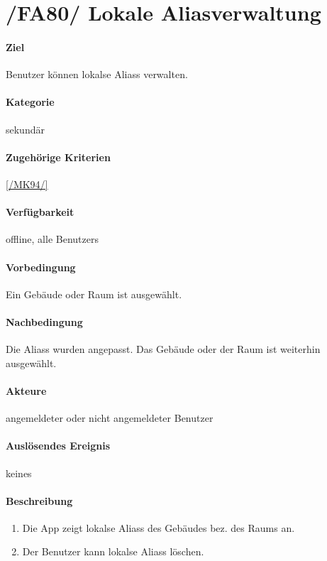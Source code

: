 \section[Lokale Aliasverwaltung]{/FA80/ Lokale Aliasverwaltung}
\label{/FA80/}
\paragraph{Ziel}
\Gls{Benutzer} können \glspl{lokal}e \Glspl{Alias} verwalten.
\paragraph{Kategorie}
sekundär
\paragraph{Zugehörige Kriterien}
\ref{/MK94/}
\paragraph{Verfügbarkeit}
\gls{offline}, alle \Glspl{Benutzer}
\paragraph{Vorbedingung}
Ein Gebäude oder Raum ist ausgewählt.
\paragraph{Nachbedingung}
Die \Glspl{Alias} wurden angepasst. Das Gebäude oder der Raum ist weiterhin ausgewählt.
\paragraph{Akteure}
angemeldeter oder nicht angemeldeter \Gls{Benutzer}
\paragraph{Auslösendes Ereignis} keines
\paragraph{Beschreibung}
\begin{enumerate}
      \item Die App zeigt \glspl{lokal}e \Glspl{Alias} des Gebäudes bez. des Raums an.
      \item Der \Gls{Benutzer} kann \glspl{lokal}e \Glspl{Alias} löschen.
\end{enumerate}